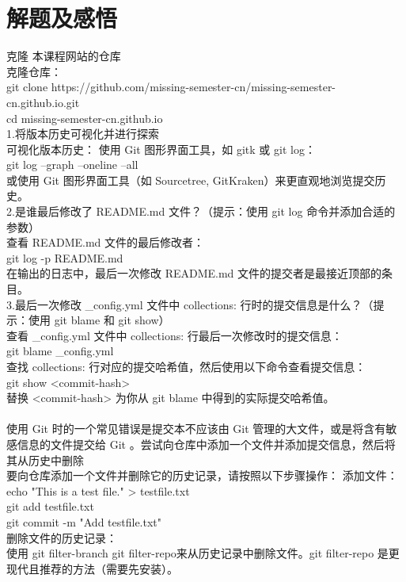 \documentclass[a4paper, 12pt]{article}
\begin{document}
\section{解题及感悟}
克隆 本课程网站的仓库\\
克隆仓库：\\
git clone https://github.com/missing-semester-cn/missing-semester-cn.github.io.git\\
cd missing-semester-cn.github.io\\
1.将版本历史可视化并进行探索\\
可视化版本历史： 使用 Git 图形界面工具，如 gitk 或 git log：\\
git log --graph --oneline --all\\
或使用 Git 图形界面工具（如 Sourcetree, GitKraken）来更直观地浏览提交历史。\\
2.是谁最后修改了 README.md 文件？（提示：使用 git log 命令并添加合适的参数）\\
查看 README.md 文件的最后修改者：\\
git log -p README.md\\
在输出的日志中，最后一次修改 README.md 文件的提交者是最接近顶部的条目。\\
3.最后一次修改 \_config.yml 文件中 collections: 行时的提交信息是什么？（提示：使用 git blame 和 git show）\\
查看 \_config.yml 文件中 collections: 行最后一次修改时的提交信息：\\
git blame \_config.yml\\
查找 collections: 行对应的提交哈希值，然后使用以下命令查看提交信息：\\
git show <commit-hash>\\
替换 <commit-hash> 为你从 git blame 中得到的实际提交哈希值。\\\\
使用 Git 时的一个常见错误是提交本不应该由 Git 管理的大文件，或是将含有敏感信息的文件提交给 Git 。尝试向仓库中添加一个文件并添加提交信息，然后将其从历史中删除\\
要向仓库添加一个文件并删除它的历史记录，请按照以下步骤操作：
添加文件：\\
   echo "This is a test file." > testfile.txt\\
   git add testfile.txt\\
   git commit -m "Add testfile.txt"\\
删除文件的历史记录：\\
   使用 git filter-branch git filter-repo来从历史记录中删除文件。git filter-repo 是更现代且推荐的方法（需要先安装）。\\
\end{document}
